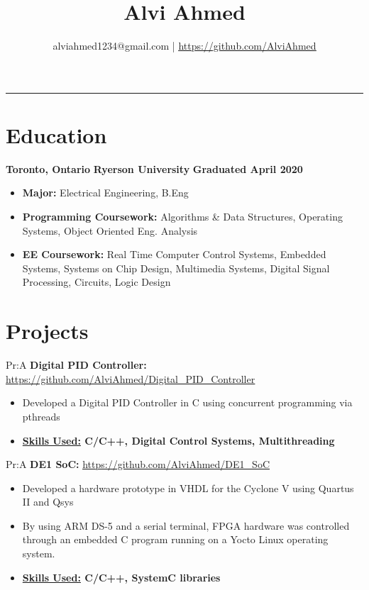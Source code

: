 \documentclass[11pt]{article}
\title{
	Alvi Ahmed
}
\author{alviahmed1234@gmail.com | \underline{\url{https://github.com/AlviAhmed}}}
\newcommand{\spaces}{1em}
\newcommand{\uniname}{Ryerson University}
\newcommand{\unigrad}{Graduated April 2020}
\newcommand{\uniloc}{Toronto, Ontario}
\newcommand{\uni}[3]{
  \begin{flushleft}
    {\small\bfseries #1}
    \hfill
    {\small\bfseries #2}
    \hfill
    {\small\bfseries #3}
\end{flushleft}
  \vspace{-0.7em}
}
\renewcommand{\maketitle}{
    \begin{center}
    \phantom{.} %
    \vspace{-2em}
    	{\Huge\bfseries \thetitle}
    	\vspace{-0.5em}
		\par\noindent\rule{\textwidth}{2pt}
	\end{center} 
	\begin{center} 
		\vspace{-1em}  
		{\small\theauthor}
	\end{center}
}
\begin{document}

\maketitle    

\section*{Education}
	\uni{\uniloc}{\uniname}{\unigrad}
	\begin{itemize}[noitemsep,nolistsep]   
		\item \textbf{Major:} Electrical Engineering, B.Eng
        \item \textbf{Programming Coursework: } Algorithms \& Data Structures,
           Operating Systems, Object Oriented Eng. Analysis 
        \item \textbf{EE Coursework: } Real Time Computer Control Systems,
          Embedded Systems, Systems on Chip Design, Multimedia Systems,
          Digital Signal Processing, Circuits, Logic Design
        \end{itemize}
        \section*{Projects}

 
 
Pr:A
\vspace{\spaces}
\textbf{Digital PID Controller: }
\underline{\url{https://github.com/AlviAhmed/Digital_PID_Controller}}
\begin{itemize}[noitemsep,nolistsep]
\item Developed a Digital PID Controller in C using concurrent programming via pthreads
\item \textbf{ \underline{Skills Used:} C/C++, Digital Control Systems, Multithreading}
\end{itemize} 

 
Pr:A
\vspace{\spaces}
\textbf{DE1 SoC: }
\underline{\url{https://github.com/AlviAhmed/DE1_SoC}}
\begin{itemize}[noitemsep,nolistsep]
\item Developed a hardware prototype in VHDL for the Cyclone V using Quartus II and Qsys
\item By using ARM DS-5 and a serial terminal, FPGA hardware was controlled through an embedded C program running on a Yocto Linux operating system.
\item \textbf{\underline{Skills Used:} C/C++, SystemC libraries}
\end{itemize} 
\end{document}
